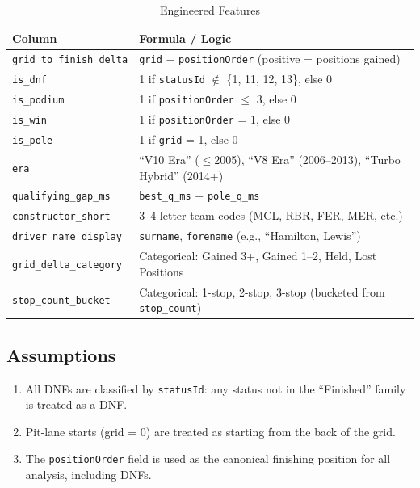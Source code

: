 \documentclass[12pt, a4paper]{article}
\begin{document}
\begin{table}[H]
\centering
\caption{Engineered Features}
\begin{tabular}{l l}
\toprule
\textbf{Column} & \textbf{Formula / Logic} \\
\midrule
\texttt{grid\_to\_finish\_delta} & \texttt{grid} $-$ \texttt{positionOrder} (positive = positions gained) \\
\texttt{is\_dnf}             & 1 if \texttt{statusId} $\notin$ \{1, 11, 12, 13\}, else 0 \\
\texttt{is\_podium}          & 1 if \texttt{positionOrder} $\leq$ 3, else 0 \\
\texttt{is\_win}             & 1 if \texttt{positionOrder} = 1, else 0 \\
\texttt{is\_pole}            & 1 if \texttt{grid} = 1, else 0 \\
\texttt{era}                 & ``V10 Era'' ($\leq$2005), ``V8 Era'' (2006--2013), ``Turbo Hybrid'' (2014+) \\
\texttt{qualifying\_gap\_ms} & \texttt{best\_q\_ms} $-$ \texttt{pole\_q\_ms} \\
\texttt{constructor\_short}  & 3--4 letter team codes (MCL, RBR, FER, MER, etc.) \\
\texttt{driver\_name\_display} & \texttt{surname}, \texttt{forename} (e.g., ``Hamilton, Lewis'') \\
\texttt{grid\_delta\_category} & Categorical: Gained 3+, Gained 1--2, Held, Lost Positions \\
\texttt{stop\_count\_bucket} & Categorical: 1-stop, 2-stop, 3-stop (bucketed from \texttt{stop\_count}) \\
\bottomrule
\end{tabular}
\end{table}

\subsection{Assumptions}
\begin{enumerate}[noitemsep]
    \item All DNFs are classified by \texttt{statusId}: any status not in the ``Finished'' family is treated as a DNF.
    \item Pit-lane starts (grid = 0) are treated as starting from the back of the grid.
    \item The \texttt{positionOrder} field is used as the canonical finishing position for all analysis, including DNFs.
\end{enumerate}
\end{document}
